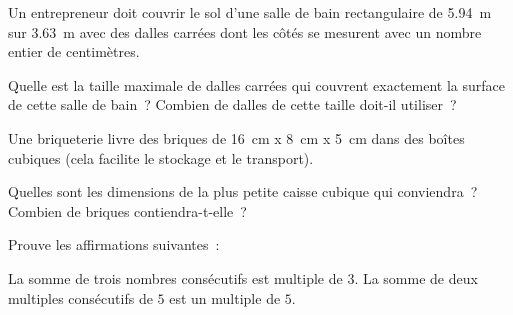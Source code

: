 \documentclass[../math2.tex]{subfiles}
\begin{document}
\begin{exercise}
    Un entrepreneur doit couvrir le sol d'une salle de bain rectangulaire de \SI{5,94}{m} sur \SI{3,63}{m} avec des dalles carrées dont les côtés se mesurent avec un nombre entier de centimètres.
    \begin{tasks}
        \task Quelle est la taille maximale de dalles carrées qui couvrent exactement la surface de cette salle de bain~?
        \task Combien de dalles de cette taille doit-il utiliser~?
    \end{tasks}
\end{exercise}

\begin{exercise}
    Une briqueterie livre des briques de \SI{16}{cm} x \SI{8}{cm} x \SI{5}{cm} dans des boîtes cubiques (cela facilite le stockage et le transport).
    \begin{tasks}
        \task Quelles sont les dimensions de la plus petite caisse cubique qui conviendra~?
        \task Combien de briques contiendra-t-elle~?
    \end{tasks}
\end{exercise}

\begin{exercise}
    Prouve les affirmations suivantes~:
    \begin{tasks}
        \task La somme de trois nombres consécutifs est multiple de $3$.
        \task La somme de deux multiples consécutifs de $5$ est un multiple de $5$.
    \end{tasks}
\end{exercise}
\end{document}
